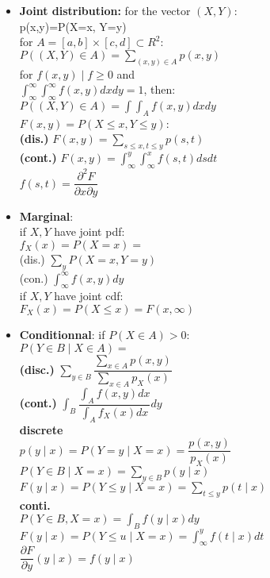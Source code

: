 \documentclass[a4paper, 10pt, landscape]{article}
\begin{document}
\begin{multicols*}{4}
\begin{itemize}
\item{\textbf{Joint distribution:} for the vector $(X,Y)$: \\ \textbullet p(x,y)=P(X=x, Y=y) \\ \textbullet for $A = \left[ a,b \right] \times \left[ c,d \right] \subset R^2$: \\ $P((X,Y)\in A) = \displaystyle{\sum_{(x,y) \in A} p(x,y)}$ \\ \textbullet for $f(x,y) \mid f\geq0$ and \\ $\displaystyle{\int_{\infty}^{\infty} \int_{\infty}^{\infty} f(x,y) dxdy =1}$, then: \\ $P((X,Y) \in A) = \displaystyle{\int \int _{A} f(x,y) dxdy}$ \\ \textbullet $F(x,y)=P(X\leq x, Y\leq y)$: \\ \textbf{(dis.)} $F(x,y)= \displaystyle{\sum_{s\leq x, t\leq y} p(s,t)}$ \\ \textbf{(cont.)} $F(x,y)=\displaystyle{\int_{\infty}^y \int_{\infty}^x f(s,t) dsdt}$ \\ \textbullet $f(s,t)= \dfrac{\partial ^2 F}{\partial x \partial y}$} 
\item{\textbf{Marginal}: \\ \textbullet if $X,Y$ have joint pdf: \\
$f_X(x) = P(X=x)=$ \\ (dis.) $\displaystyle{\sum_y P(X=x,Y=y)}$ \\ (con.) $\displaystyle{\int_{\infty}^{\infty} f(x,y)dy}$ \\ \textbullet if $X,Y$ have joint cdf: \\ $F_X(x) = P(X\leq x)= F(x, \infty)$}
\item{\textbf{Conditionnal}: if $P(X\in A)>0$: \\ $P(Y \in B \mid X\in A) = $ \\ \textbf{(disc.)} $\displaystyle{\sum_{y\in B} \dfrac{\sum_{x\in A} p(x,y)}{\sum_{x \in A} p_X(x)}}$ \\
\textbf{(cont.)} $\displaystyle{\int_B \dfrac{\int_A f(x,y)dx}{\int_A f_X(x)dx} dy}$ \\ \textbf{discrete} \\ \textbullet  $p(y\mid x)=P(Y=y \mid X=x) = \dfrac{p(x,y)}{p_X(x)}$ \\ \textbullet $P(Y\in B \mid X=x)= \displaystyle{\sum_{y\in B} p(y\mid x)}$ \\ \textbullet $F(y\mid x)=P(Y\leq y \mid X=x)= \displaystyle{\sum_{t\leq y} p(t\mid x)}$ \\ \textbf{conti.} \\ \textbullet $P(Y \in B, X=x)= \displaystyle{ \int_B f(y\mid x)dy}$ \\ \textbullet $F(y\mid x)=P(Y\leq u \mid X=x)= \displaystyle{\int_{\infty}^y f(t \mid x) dt}$ \\ \textbullet $\dfrac{\partial F}{\partial y}(y\mid x)=f(y\mid x)$}

\end{itemize}
\end{multicols*}
\end{document}
